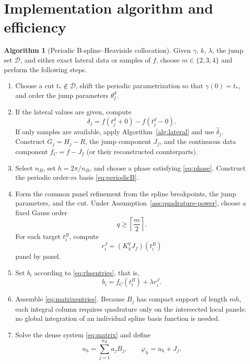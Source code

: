 \documentclass[11pt,a4paper]{amsart}
\theoremstyle{plain}
\theoremstyle{definition}
\newtheorem{algorithm}[theorem]{Algorithm}
\theoremstyle{remark}
\newcommand{\D}{\mathcal D}
\begin{document}
\section{Implementation algorithm and efficiency}\label{sec:algorithm}

\begin{algorithm}[Periodic B-spline--Heaviside collocation]\label{alg:direct}
Given $\gamma$, $k$, $\lambda$, the jump set $\D$, and either exact lateral data or samples of $f$, choose $m\in\{2,3,4\}$ and perform the following steps.
\begin{enumerate}[label=\textbf{Step \arabic*.},leftmargin=2.6cm]
\item Choose a cut $t_*\notin\D$, shift the periodic parametrization so that $\gamma(0)=t_*$, and order the jump parameters $\theta_j^d$.

\item If the lateral values are given, compute
\[
        \delta_j=f(t_j^d+0)-f(t_j^d-0).
\]
If only samples are available, apply Algorithm~\ref{alg:lateral} and use $\widehat\delta_j$.  Construct $G_j=H_j-R$, the jump component $J_f$, and the continuous data component $f_C=f-J_f$ (or their reconstructed counterparts).

\item Select $n_B$, set $h=2\pi/n_B$, and choose a phase satisfying \eqref{eq:phase}.  Construct the periodic order-$m$ basis \eqref{eq:periodicB}.

\item Form the common panel refinement from the spline breakpoints, the jump parameters, and the cut.  Under Assumption~\ref{ass:quadrature-power}, choose a fixed Gauss order
\[
        q\ge\left\lceil\frac m2\right\rceil.
\]
For each target $t_i^B$, compute
\[
        r_i^J=(K_h^qJ_f)(t_i^B)
\]
panel by panel.

\item Set $b_i$ according to \eqref{eq:rhsentries}, that is,
\[
        b_i=f_C(t_i^B)+\lambda r_i^J.
\]

\item Assemble \eqref{eq:matrixentries}.  Because $B_j$ has compact support of length $mh$, each integral column requires quadrature only on the intersected local panels; no global integration of an individual spline basis function is needed.

\item Solve the dense system \eqref{eq:matrix} and define
\[
        u_h=\sum_{j=1}^{n_B}a_jB_j,
        \qquad \varphi_h=u_h+J_f.
\]


\end{enumerate}
\end{algorithm}
\end{document}
